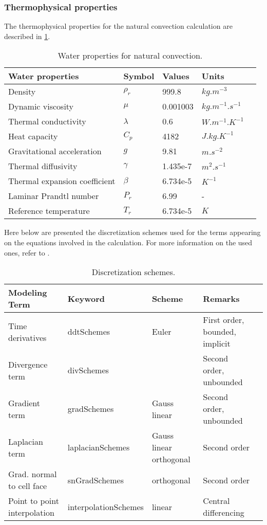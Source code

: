\subsubsection*{Thermophysical properties}
The thermophysical properties for the natural convection calculation are described in \ref{3.3tab}. 
\begin{table}[h!]
	\begin{tabular}{@{}lllll@{}}
		\toprule[1pt]
		\textbf{Water properties} & \textbf{Symbol} & \textbf{Values} & \textbf{Units} &  \\ \midrule[2pt]
		Density & $\rho_r$ & 999.8 & $kg.m^{-3}$ \\
		Dynamic viscosity & $\mu$ & 0.001003 & $kg.m^{-1}.s^{-1}$ \\
		Thermal conductivity & $\lambda$ & 0.6 & $W.m^{-1}.K^{-1}$ \\
		Heat capacity & $C_p$ & 4182 & $J.kg.K^{-1}$ \\		 
		Gravitational acceleration & $g$ &  9.81  & $m.s^{-2}$ \\
		Thermal diffusivity & $\gamma$ &  1.435e-7  & $m^{2}.s^{-1}$ \\		
		Thermal expansion coefficient & $\beta$ &  6.734e-5  & $K^{-1}$ \\	
		Laminar Prandtl number & $P_r$ &  6.99  & - \\
		Reference temperature & $T_r$ &  6.734e-5  & $K$ \\ \bottomrule[1pt]		
	\end{tabular}
	\centering
	\caption{Water properties for natural convection.}	
	\label{3.3tab}
\end{table}
\newline
Here below are presented the discretization schemes used for the terms appearing on the equations involved in the calculation. For more information on the used ones, refer to \cite{openfoamuserguide:cfddirect}.
\begin{table}[h!]
	\begin{adjustbox}{width=1\textwidth}
		\small	
		\begin{tabular}{@{}lllll@{}}
			\toprule[1pt]
			\textbf{Modeling Term} & \textbf{Keyword} & \textbf{Scheme} & \textbf{Remarks} &  \\ \midrule[2pt]
			Time derivatives & ddtSchemes    &  Euler  & First order, bounded, implicit \\
			Divergence term    & divSchemes   &    & Second order, unbounded \\
			Gradient term    & gradSchemes    &  Gauss linear  & Second order, unbounded \\
			Laplacian term   &  laplacianSchemes    &  Gauss linear orthogonal  & Second order \\		 
			Grad. normal to cell face & snGradSchemes    &  orthogonal  &  Second order\\ 
			Point to point interpolation&    			   interpolationSchemes    & linear   & Central differencing \\ \bottomrule[1pt]		
		\end{tabular}
	\end{adjustbox}
	\centering
	\caption{Discretization schemes.}	
	\label{3.4tab}
\end{table}

